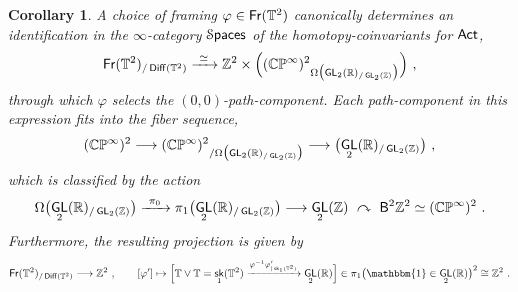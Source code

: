 \documentclass{amsart}
\newtheorem{cor}[theorem]{Corollary}
\theoremstyle{definition}
\theoremstyle{remark}
\newcommand{\lacts}{\curvearrowright}
\DeclareMathOperator{\Diff}{{\sf Diff}}
\DeclareMathOperator{\sk}{\mathsf{sk}}
\DeclareMathOperator{\Spaces}{\cS\mathsf{paces}}
\newcommand{\xra}{\xrightarrow}
\DeclareMathOperator{\uno}{\mathbbm{1}}
\DeclareMathOperator{\GL}{\sf GL}
\DeclareMathOperator{\Fr}{\sf Fr}
\DeclareMathOperator{\Act}{\sf Act}
\begin{document}
\begin{cor}
\label{t26}
A choice of framing $\varphi \in \Fr(\TT^2)$ canonically determines an identification in the $\infty$-category $\Spaces$ of the homotopy-coinvariants for $\Act$,
\[
\Fr(\TT^2)_{/\Diff(\TT^2)} 
\xra{~\simeq~}
\ZZ^2
\times
\Bigl(
{(\CC\PP^\infty)^2}_{ \Omega
\bigl( \GL_2(\RR)_{/\GL_2(\ZZ)} \bigr)
}
\Bigr)
~,
\]
through which $\varphi$ selects the $(0,0)$-path-component. 
Each path-component in this expression fits into the fiber sequence,
\[
(\CC\PP^\infty)^2
\longrightarrow
{(\CC\PP^\infty)^2}_{/\Omega
\bigl( \GL_2(\RR)_{/\GL_2(\ZZ)} \bigr)
}
\longrightarrow
\bigl( \GL_2(\RR)_{/\GL_2(\ZZ)} \bigr)
~,
\]
which is classified by the action
\[
\Omega
\bigl( \GL_2(\RR)_{/\GL_2(\ZZ)} \bigr)
\xra{~\pi_0~}
\pi_1
\bigl( \GL_2(\RR)_{/\GL_2(\ZZ)} \bigr)
\longrightarrow
\GL_2(\ZZ)
~\lacts~
\sB^2 \ZZ^2 \simeq (\CC\PP^\infty)^2
~.
\]
Furthermore, the resulting projection is given by
\[
\Fr(\TT^2)_{/\Diff(\TT^2)}
\longrightarrow
\ZZ^2
~,\qquad
[\varphi']
\mapsto
\Bigl[
\TT \vee \TT = \sk_1(\TT^2)
\xra{ \varphi^{-1} \varphi' _{|\sk_1(\TT^2)} }
\GL_2(\RR) 
\Bigr]
\in \pi_1\bigl(\uno \in \GL_2(\RR)\bigr)^2 \cong \ZZ^2
~.
\]



\end{cor}
\end{document}
